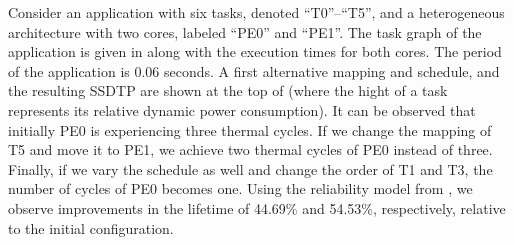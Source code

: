 Consider an application with six tasks, denoted ``T0''--``T5'', and a heterogeneous architecture with two cores, labeled ``PE0'' and ``PE1''. The task graph of the application is given in  along with the execution times for both cores. The period of the application is 0.06 seconds. A first alternative mapping and schedule, and the resulting SSDTP are shown at the top of  (where the hight of a task represents its relative dynamic power consumption). It can be observed that initially PE0 is experiencing three thermal cycles. If we change the mapping of T5 and move it to PE1, we achieve two thermal cycles of PE0 instead of three. Finally, if we vary the schedule as well and change the order of T1 and T3, the number of cycles of PE0 becomes one. Using the reliability model from , we observe improvements in the lifetime of 44.69\% and 54.53\%, respectively, relative to the initial configuration.
